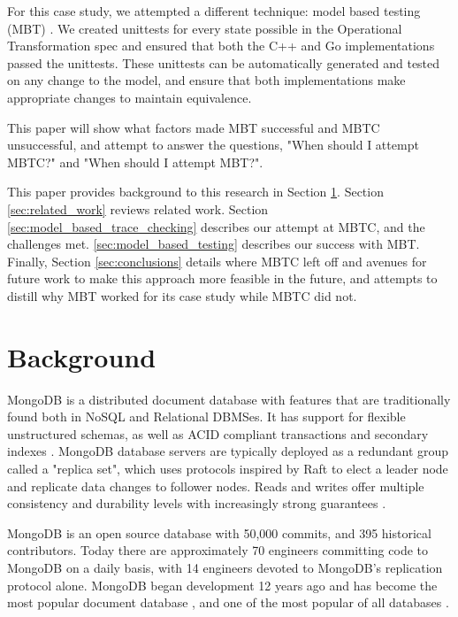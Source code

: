 \documentclass{vldb}
\begin{document}
For this case study, we attempted a different technique: model based testing (MBT) \cite{Gravell11ConcurrentDevelopmentOfModelAndImplementation}.
We created unittests for every state possible in the Operational Transformation spec and ensured that both the C++ and Go implementations passed the unittests.
These unittests can be automatically generated and tested on any change to the model, and ensure that both implementations make appropriate changes to maintain equivalence. 

This paper will show what factors made MBT successful and MBTC unsuccessful, and attempt to answer the questions, "When should I attempt MBTC?" and "When should I attempt MBT?".

This paper provides background to this research in Section \ref{sec:background}. 
Section \ref{sec:related_work} reviews related work. 
Section \ref{sec:model_based_trace_checking} describes our attempt at MBTC, and the challenges met. 
\ref{sec:model_based_testing} describes our success with MBT. 
Finally, Section \ref{sec:conclusions} details where MBTC left off and avenues for future work to make this approach more feasible in the future, and attempts to distill why MBT worked for its case study while MBTC did not.

\section{Background}
\label{sec:background}
MongoDB is a distributed document database with features that are traditionally found both in NoSQL and Relational DBMSes.
It has support for flexible unstructured schemas, as well as ACID compliant transactions and secondary indexes \cite{Kamsky19TPCCMongoDB}.
MongoDB database servers are typically deployed as a redundant group called a "replica set", which uses protocols inspired by Raft \cite{Ongaro14Raft} to elect a leader node and replicate data changes to follower nodes.
Reads and writes offer multiple consistency and durability levels with increasingly strong guarantees \cite{Schultz19TunableConsistency, Tyulenev19CausalConsistencyMongoDB}.

MongoDB is an open source database with 50,000 commits, and 395 historical contributors. 
Today there are approximately 70 engineers committing code to MongoDB on a daily basis, with 14 engineers devoted to MongoDB's replication protocol alone.
MongoDB began development 12 years ago and has become the most popular document database \cite{DBEnginesDocumentDBs}, and one of the most popular of all databases \cite{DBEnginesDBs}.
\end{document}
